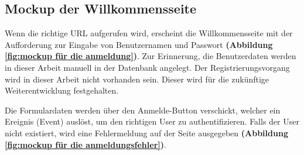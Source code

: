 \subsection{Mockup der Willkommensseite}
\label{subsec:mockup der willkommensseite}
Wenn die richtige URL aufgerufen wird, erscheint die Willkommensseite mit der Aufforderung zur Eingabe von Benutzernamen und Passwort \textbf{(Abbildung \ref{fig:mockup für die anmeldung})}. Zur Erinnerung, die Benutzerdaten werden in dieser Arbeit manuell in der Datenbank angelegt. Der Registrierungsvorgang wird in dieser Arbeit nicht vorhanden sein. Dieser wird für die zukünftige Weiterentwicklung festgehalten.\bigskip

Die Formulardaten werden über den Anmelde-Button verschickt, welcher ein Ereignis (Event) auslöst, um den richtigen User zu authentifizieren. Falls der User nicht existiert, wird eine Fehlermeldung auf der Seite ausgegeben \textbf{(Abbildung \ref{fig:mockup für die anmeldungsfehler})}.\bigskip

